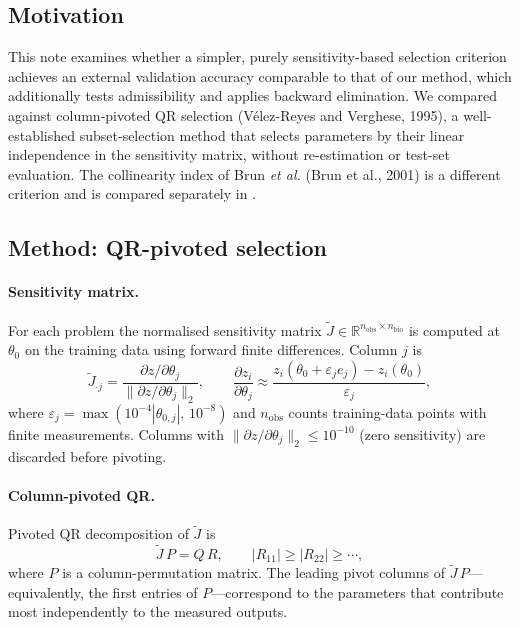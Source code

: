 
\subsection*{Motivation}

This note examines whether a simpler, purely sensitivity-based selection criterion achieves an external validation accuracy comparable to that of our method, which additionally tests admissibility and applies backward elimination. We compared against column-pivoted QR selection (Vélez-Reyes and Verghese, 1995), a well-established subset-selection method that selects parameters by their linear independence in the sensitivity matrix, without re-estimation or test-set evaluation. The collinearity index of Brun \emph{et al.} (Brun et al., 2001) is a different criterion and is compared separately in .

\subsection*{Method: QR-pivoted selection}

\paragraph{Sensitivity matrix.}
For each problem the normalised sensitivity matrix $\widetilde{J}\in\mathbb{R}^{n_{\mathrm{obs}}\times n_{\mathrm{bio}}}$ is computed at $\theta_0$ on the training data using forward finite differences.  Column $j$ is
\[
  \widetilde{J}_{\cdot j} = \frac{\partial z / \partial\theta_j}{\|\partial z / \partial\theta_j\|_2},
  \qquad
  \frac{\partial z_i}{\partial\theta_j} \approx \frac{z_i(\theta_0 + \varepsilon_j e_j) - z_i(\theta_0)}{\varepsilon_j},
\]
where $\varepsilon_j = \max(10^{-4}|\theta_{0,j}|,\, 10^{-8})$ and $n_{\mathrm{obs}}$ counts training-data points with finite measurements. Columns with $\|\partial z/\partial\theta_j\|_2 \le 10^{-10}$ (zero sensitivity) are discarded before pivoting.

\paragraph{Column-pivoted QR.}
Pivoted QR decomposition of $\widetilde{J}$ is
\[
  \widetilde{J}\,P = Q\,R, \qquad |R_{11}| \ge |R_{22}| \ge \cdots,
\]
where $P$ is a column-permutation matrix.  The leading pivot columns of $\widetilde{J}\,P$---equivalently, the first entries of $P$---correspond to the parameters that contribute most independently to the measured outputs.

